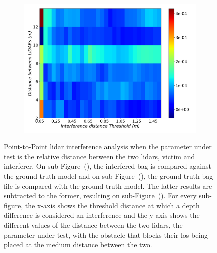 \begin{figure}[!ht]
\begin{subfigure}[c]{0.45\textwidth}
	\label{fig:los:ground-truth-color-mesh}
\end{subfigure}
\\ \vspace{4mm}
\begin{subfigure}[c]{0.6\textwidth}
	\includegraphics[width=\textwidth]{img/lidar-interference/LOS/difference_ground_truth_interference_measurement.png}
\caption{}%
	\label{fig:los:difference-color-mesh}
\end{subfigure}

\caption[Point-to-Point analysis when the \ac{los} between the \acp{lidar} is obstructed and their relative distance is  variated.]{Point-to-Point \ac{lidar} interference analysis when the parameter under test is the relative distance between the two \acp{lidar}, victim and interferer. On sub-Figure~(), the interfered bag is compared against the ground truth model and on sub-Figure~(), the ground truth bag file is compared with the ground truth model. The latter results are subtracted to the former, resulting on sub-Figure~(). For every sub-figure, the x-axis shows the threshold distance at which a depth difference is considered an interference and the y-axis shows the different values of the distance between the two \acp{lidar}, the parameter under test, with the obstacle that blocks their \ac{los} being placed at the medium distance between the two.}
\label{fig:los:color-mesh}
\end{figure}

